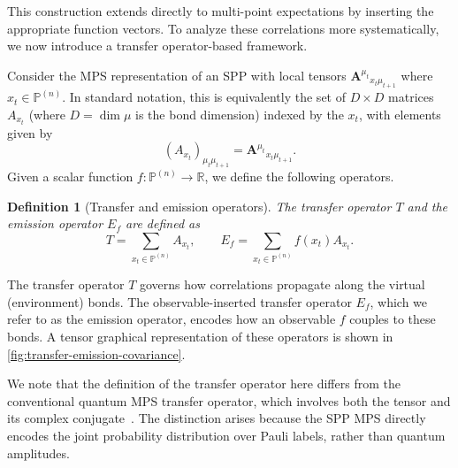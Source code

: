 \documentclass[
    aps,
    prx,
    reprint,
    superscriptaddress,
    longbibliography,
    nofootinbib,
    floatfix,
]{revtex4-2}
\newtheorem{definition}[theorem]{Definition}
\begin{document}
This construction extends directly to multi-point expectations by inserting the appropriate function vectors. To analyze these correlations more systematically, we now introduce a transfer operator-based framework.

Consider the MPS representation of an SPP with local tensors \(\mathbf{A}^{\mu_t}{}_{x_t\mu_{t+1}}\) where \(x_t \in \mathbb{P}^{(n)}\). In standard notation, this is equivalently the set of \(D \times D\) matrices \(A_{x_t}\) (where \(D = \dim{\mu}\) is the bond dimension) indexed by the \(x_t\), with elements given by
\begin{equation}
    (A_{x_t})_{\mu_t \mu_{t+1}} = \mathbf{A}^{\mu_t}{}_{x_t \mu_{t+1}}.
\end{equation}
Given a scalar function \(f : \mathbb{P}^{(n)} \to \mathbb{R}\), we define the following operators.
\begin{definition}[Transfer and emission operators]
    The transfer operator \(T\) and the emission operator \(E_f\) are defined as 
\begin{equation}
    T = \sum_{x_t\in\mathbb{P}^{(n)}}A_{x_t},
    \qquad
    E_f = \sum_{x_t\in\mathbb{P}^{(n)}} f(x_t) A_{x_t}.
\end{equation}
\end{definition}

The transfer operator \(T\) governs how correlations propagate along the virtual (environment) bonds. The observable-inserted transfer operator \(E_f\), which we refer to as the emission operator, encodes how an observable \(f\) couples to these bonds. A tensor graphical representation of these operators is shown in \cref{fig:transfer-emission-covariance}.

We note that the definition of the transfer operator here differs from the conventional quantum MPS transfer operator, which involves both the tensor and its complex conjugate~\cite{schollwockDensitymatrixRenormalizationGroup2005}. The distinction arises because the SPP MPS directly encodes the joint probability distribution over Pauli labels, rather than quantum amplitudes.
\end{document}
